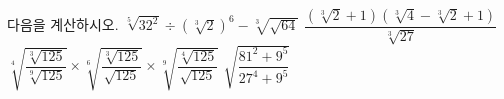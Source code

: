 다음을 계산하시오.
 $\sqrt[5]{32^2}\div(\sqrt[3]{2})^{6}-\sqrt[3]{\sqrt{64}}$
 $\dfrac{(\sqrt[3]{2}+1)(\sqrt[3]{4}-\sqrt[3]{2}+1)}{\sqrt[3]{27}}$
 $\sqrt[4]{\dfrac{\sqrt[3]{125}}{\sqrt[9]{125}}}\times\sqrt[6]{\dfrac{\sqrt[3]{125}}{\sqrt{125}}}\times\sqrt[9]{\dfrac{\sqrt[4]{125}}{\sqrt{125}}}$
 $\sqrt{\dfrac{81^{2}+9^{5}}{27^{4}+9^{5}}}$
